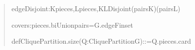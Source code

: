 \documentclass[english,11pt,a4paper]{article}
\newlength{\LeanCharWidth}
\begin{document}
\begin{quote}
\noindent \hspace*{\dimexpr 2\LeanCharWidth\relax}edgeDisjoint\hspace*{\dimexpr 1\LeanCharWidth\relax}:\hspace*{\dimexpr 1\LeanCharWidth\relax}{\LeanSymbols ∀}\hspace*{\dimexpr 1\LeanCharWidth\relax}K\hspace*{\dimexpr 1\LeanCharWidth\relax}{\LeanSymbols ∈}\hspace*{\dimexpr 1\LeanCharWidth\relax}pieces,\hspace*{\dimexpr 1\LeanCharWidth\relax}{\LeanSymbols ∀}\hspace*{\dimexpr 1\LeanCharWidth\relax}L\hspace*{\dimexpr 1\LeanCharWidth\relax}{\LeanSymbols ∈}\hspace*{\dimexpr 1\LeanCharWidth\relax}pieces,\hspace*{\dimexpr 1\LeanCharWidth\relax}K\hspace*{\dimexpr 1\LeanCharWidth\relax}{\LeanSymbols ≠}\hspace*{\dimexpr 1\LeanCharWidth\relax}L\hspace*{\dimexpr 1\LeanCharWidth\relax}{\LeanSymbols →}\hspace*{\dimexpr 1\LeanCharWidth\relax}Disjoint\hspace*{\dimexpr 1\LeanCharWidth\relax}(pairs\hspace*{\dimexpr 1\LeanCharWidth\relax}K)\hspace*{\dimexpr 1\LeanCharWidth\relax}(pairs\hspace*{\dimexpr 1\LeanCharWidth\relax}L)\par
\noindent \hspace*{\dimexpr 2\LeanCharWidth\relax}covers\hspace*{\dimexpr 1\LeanCharWidth\relax}:\hspace*{\dimexpr 1\LeanCharWidth\relax}pieces.biUnion\hspace*{\dimexpr 1\LeanCharWidth\relax}pairs\hspace*{\dimexpr 1\LeanCharWidth\relax}=\hspace*{\dimexpr 1\LeanCharWidth\relax}G.edgeFinset\par
\noindent \strut\par
\noindent def\hspace*{\dimexpr 1\LeanCharWidth\relax}CliquePartition.size\hspace*{\dimexpr 1\LeanCharWidth\relax}(Q\hspace*{\dimexpr 1\LeanCharWidth\relax}:\hspace*{\dimexpr 1\LeanCharWidth\relax}CliquePartition\hspace*{\dimexpr 1\LeanCharWidth\relax}G)\hspace*{\dimexpr 1\LeanCharWidth\relax}:\hspace*{\dimexpr 1\LeanCharWidth\relax}{\LeanSymbols ℕ}\hspace*{\dimexpr 1\LeanCharWidth\relax}:=\hspace*{\dimexpr 1\LeanCharWidth\relax}Q.pieces.card\par

\end{quote}
\end{document}
